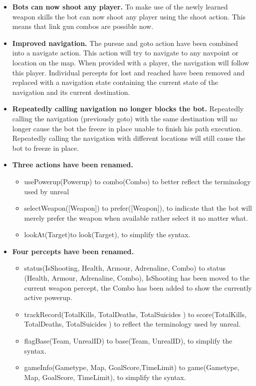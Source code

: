 \documentclass[11pt,a4paper]{article}
\begin{document}
\begin{itemize}
	\item \textbf{Bots can now shoot any player.} To make use of the newly learned weapon skills the bot can now shoot any player using the shoot action. This means that link gun combos are possible now.
	\item \textbf{Improved navigation.} The pursue and goto action have been combined into a navigate action. This action will try to navigate to any navpoint or location on the map. When provided with a player, the navigation will follow this player. Individual percepts for lost and reached have been removed and replaced with a navigation state containing the current state of the navigation and its current destination.
	\item \textbf{Repeatedly calling navigation no longer blocks the bot.} Repeatedly calling the navigation (previously goto) with the same destination will no longer cause the bot the freeze in place unable to finish his path execution. Repeatedly calling the navigation with different locations will still cause the bot to freeze in place. 
	\item \textbf{Three actions have been renamed.} 
		\begin{itemize}
			\item  usePowerup(Powerup) to combo(Combo) to better reflect the terminology used by unreal
			\item  selectWeapon([Weapon]) to prefer([Weapon]), to indicate that the bot will merely prefer the weapon when available rather select it no matter what.
			\item   lookAt(Target)to look(Target), to simplify the syntax.
		\end{itemize}

	\item \textbf{Four percepts have been renamed.} 
		\begin{itemize}
			\item  status(IsShooting, Health, Armour, Adrenaline, Combo) to status (Health, Armour, Adrenaline, Combo), IsShooting has been moved to the current weapon percept, the Combo has been added to show the currently active powerup.
			\item  trackRecord(TotalKills, TotalDeaths, TotalSuicides ) to score(TotalKills, TotalDeaths, TotalSuicides ) to reflect the terminology used by unreal.
			\item   flagBase(Team, UnrealID) to base(Team, UnrealID),  to simplify the syntax.
			\item  gameInfo(Gametype, Map, GoalScore,TimeLimit) to game(Gametype, Map, GoalScore, TimeLimit),  to simplify the syntax.
		\end{itemize}


\end{itemize}
\end{document}
